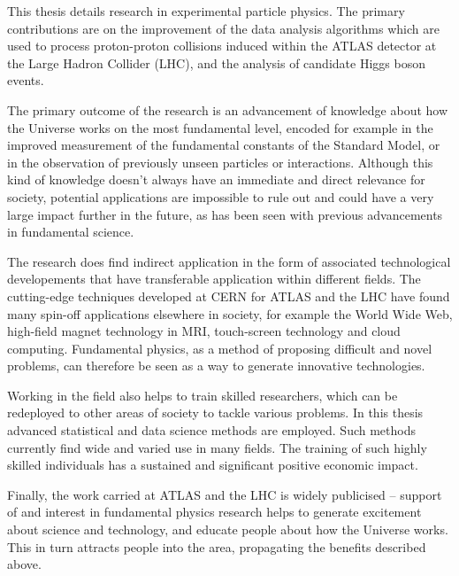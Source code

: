 
This thesis details research in experimental particle physics.
The primary contributions are on the improvement of the data analysis algorithms which are used to process proton-proton collisions induced within the ATLAS detector at the Large Hadron Collider (LHC), and the analysis of candidate Higgs boson events.

The primary outcome of the research is an advancement of knowledge about how the Universe works on the most fundamental level, encoded for example in the improved measurement of the fundamental constants of the Standard Model, or in the observation of previously unseen particles or interactions.
Although this kind of knowledge doesn't always have an immediate and direct relevance for society, potential applications are impossible to rule out and could have a very large impact further in the future, as has been seen with previous advancements in fundamental science.

The research does find indirect application in the form of associated technological developements that have transferable application within different fields.
The cutting-edge techniques developed at CERN for ATLAS and the LHC have found many spin-off applications elsewhere in society, for example the World Wide Web, high-field magnet technology in MRI, touch-screen technology and cloud computing.
Fundamental physics, as a method of proposing difficult and novel problems, can therefore be seen as a way to generate innovative technologies.

Working in the field also helps to train skilled researchers, which can be redeployed to other areas of society to tackle various problems.
In this thesis advanced statistical and data science methods are employed.
Such methods currently find wide and varied use in many fields.
The training of such highly skilled individuals has a sustained and significant positive economic impact.

Finally, the work carried at ATLAS and the LHC is widely publicised -- support of and interest in fundamental physics research helps to generate excitement about science and technology, and educate people about how the Universe works.
This in turn attracts people into the area, propagating the benefits described above.
